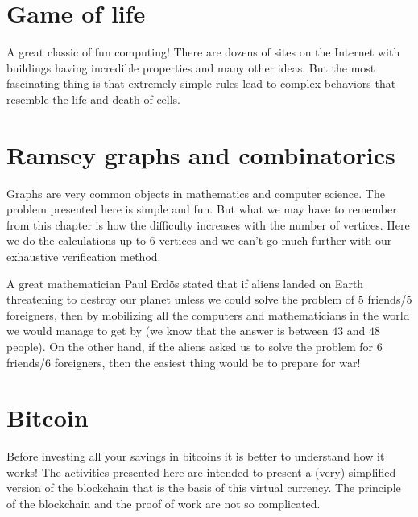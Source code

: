 \documentclass[11pt,class=report,crop=false]{standalone}
\begin{document}
\section{Game of life}

A great classic of fun computing! There are dozens of sites on the Internet with buildings having incredible properties and many other ideas. But the most fascinating thing is that extremely simple rules lead to complex behaviors that resemble the life and death of cells.



\section{Ramsey graphs and combinatorics}

Graphs are very common objects in mathematics and computer science.
The problem presented here is simple and fun. But what we may have to remember from this chapter is how the difficulty increases with the number of vertices. 
Here we do the calculations up to $6$ vertices and we can't go much further with our exhaustive verification method.


A great mathematician Paul Erd\"os stated that if aliens landed on Earth threatening to destroy our planet unless we could solve the problem of $5$ friends/$5$ foreigners, then by mobilizing all the computers and mathematicians in the world we would manage to get by (we know that the answer is between $43$ and $48$ people). On the other hand, if the aliens asked us to solve the problem for $6$ friends/$6$ foreigners, then the easiest thing would be to prepare for war!


\section{Bitcoin}

Before investing all your savings in bitcoins it is better to understand how it works! The activities presented here are intended to present a (very) simplified version of the blockchain that is the basis of this virtual currency. The principle of the blockchain and the proof of work are not so complicated.

\end{document}
